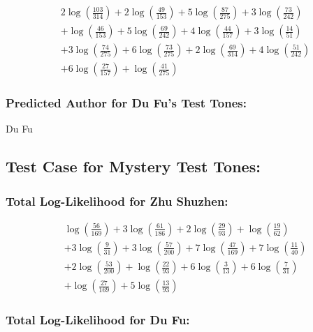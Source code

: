 \documentclass[12pt]{article}
\begin{document}
\[
\begin{aligned}
    &2 \log\left(\frac{103}{314}\right) + 2 \log\left(\frac{49}{153}\right) + 5 \log\left(\frac{87}{275}\right) + 3 \log\left(\frac{73}{242}\right) \\
    &+ \log\left(\frac{46}{153}\right) + 5 \log\left(\frac{69}{242}\right) + 4 \log\left(\frac{44}{157}\right) + 3 \log\left(\frac{14}{51}\right) \\
    &+ 3 \log\left(\frac{74}{275}\right) + 6 \log\left(\frac{73}{275}\right) + 2 \log\left(\frac{69}{314}\right) + 4 \log\left(\frac{51}{242}\right) \\
    &+ 6 \log\left(\frac{27}{157}\right) + \log\left(\frac{41}{275}\right)
\end{aligned}
\]

\subsubsection*{Predicted Author for Du Fu's Test Tones: }
Du Fu

\subsection*{Test Case for Mystery Test Tones: }

\subsubsection*{Total Log-Likelihood for Zhu Shuzhen:}

\[
\begin{aligned}
    &\log\left(\frac{56}{169}\right) + 3 \log\left(\frac{61}{186}\right) + 2 \log\left(\frac{29}{93}\right) + \log\left(\frac{19}{62}\right) \\
    &+ 3 \log\left(\frac{9}{31}\right) + 3 \log\left(\frac{57}{200}\right) + 7 \log\left(\frac{47}{169}\right) + 7 \log\left(\frac{11}{40}\right) \\
    &+ 2 \log\left(\frac{53}{200}\right) + \log\left(\frac{22}{93}\right) + 6 \log\left(\frac{3}{13}\right) + 6 \log\left(\frac{7}{31}\right) \\
    &+ \log\left(\frac{27}{169}\right) + 5 \log\left(\frac{13}{93}\right)
\end{aligned}
\]

\subsubsection*{Total Log-Likelihood for Du Fu:}
\end{document}

